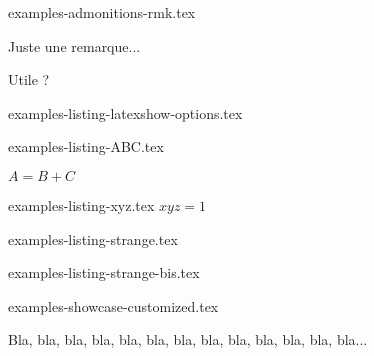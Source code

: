 \begin{filecontents*}[overwrite]{examples-admonitions-rmk.tex}
\begin{tdocrem}
    Juste une remarque...
\end{tdocrem}

\begin{tdocrem}
    Utile ?
\end{tdocrem}
\end{filecontents*}


\begin{filecontents*}[overwrite]{examples-listing-latexshow-options.tex}
\end{filecontents*}


\begin{filecontents*}[overwrite]{examples-listing-ABC.tex}
\begin{tdoclatex}[sbs]
    $A = B + C$
\end{tdoclatex}
\end{filecontents*}


\begin{filecontents*}[overwrite]{examples-listing-xyz.tex}
$x y z = 1$
\end{filecontents*}


\begin{filecontents*}[overwrite]{examples-listing-strange.tex}
\begin{tdoclatex}
\end{tdoclatex}
\end{filecontents*}


\begin{filecontents*}[overwrite]{examples-listing-strange-bis.tex}
\begin{tdoclatex}
\end{tdoclatex}
\end{filecontents*}


\begin{filecontents*}[overwrite]{examples-showcase-customized.tex}
\begin{tdocshowcase}[before     = Mon début,
                     after      = Ma fin à moi,
                     col-stripe = red,
                     col-text   = orange!75!black]
    Bla, bla, bla, bla, bla, bla, bla, bla, bla, bla, bla, bla, bla...
\end{tdocshowcase}
\end{filecontents*}


